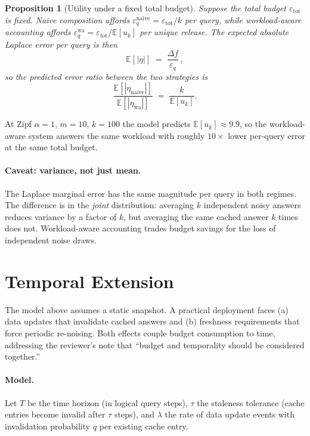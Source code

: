 \documentclass[sigconf,nonacm]{acmart}
\newcommand{\eps}{\varepsilon}
\newcommand{\E}{\mathbb{E}}
\newtheorem{prop}{Proposition}
\begin{document}
\begin{prop}[Utility under a fixed total budget]
\label{prop:utility}
Suppose the total budget $\eps_{\mathrm{tot}}$ is fixed. Naive composition affords $\eps_q^{\mathrm{naive}} = \eps_{\mathrm{tot}}/k$ per query, while workload-aware accounting affords $\eps_q^{\mathrm{wa}} = \eps_{\mathrm{tot}}/\E[u_k]$ per unique release. The expected absolute Laplace error per query is then
\[
\E[|\eta|] \;=\; \frac{\Delta f}{\eps_q}\,,
\]
so the predicted error ratio between the two strategies is
\begin{equation}
\frac{\E[|\eta_{\mathrm{naive}}|]}{\E[|\eta_{\mathrm{wa}}|]} \;=\; \frac{k}{\E[u_k]}.
\label{eq:utility-ratio}
\end{equation}
\end{prop}

\noindent At Zipf $\alpha=1$, $m=10$, $k=100$ the model predicts $\E[u_k]\approx 9.9$, so the workload-aware system answers the same workload with roughly $10\times$ lower per-query error at the same total budget.

\paragraph{Caveat: variance, not just mean.}
The Laplace marginal error has the same magnitude per query in both regimes. The difference is in the \emph{joint} distribution: averaging $k$ independent noisy answers reduces variance by a factor of $k$, but averaging the same cached answer $k$ times does not. Workload-aware accounting trades budget savings for the loss of independent noise draws.

\section{Temporal Extension}
\label{sec:temporal}

The model above assumes a static snapshot. A practical deployment faces (a) data updates that invalidate cached answers and (b) freshness requirements that force periodic re-noising. Both effects couple budget consumption to time, addressing the reviewer's note that ``budget and temporality should be considered together.''

\paragraph{Model.}
Let $T$ be the time horizon (in logical query steps), $\tau$ the staleness tolerance (cache entries become invalid after $\tau$ steps), and $\lambda$ the rate of data update events with invalidation probability $q$ per existing cache entry.
\end{document}
